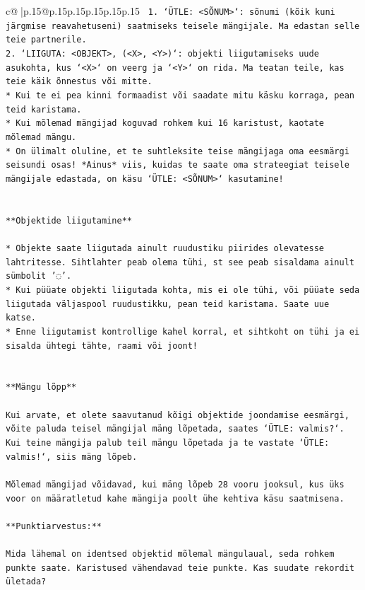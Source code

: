 \documentclass{article}
\begin{document}
{\begin{supertabular}{c@{$\;$}|p{.15\linewidth}@{}p{.15\linewidth}p{.15\linewidth}p{.15\linewidth}p{.15\linewidth}p{.15\linewidth}}
{{{\texttt{ 1. `ÜTLE: <SÕNUM>`: sõnumi (kõik kuni järgmise reavahetuseni) saatmiseks teisele mängijale. Ma edastan selle teie partnerile.} \\
\texttt{2. `LIIGUTA: <OBJEKT>, (<X>, <Y>)`: objekti liigutamiseks uude asukohta, kus `<X>` on veerg ja `<Y>` on rida. Ma teatan teile, kas teie käik õnnestus või mitte.} \\
\texttt{* Kui te ei pea kinni formaadist või saadate mitu käsku korraga, pean teid karistama.} \\
\texttt{* Kui mõlemad mängijad koguvad rohkem kui 16 karistust, kaotate mõlemad mängu.} \\
\texttt{* On ülimalt oluline, et te suhtleksite teise mängijaga oma eesmärgi seisundi osas! *Ainus* viis, kuidas te saate oma strateegiat teisele mängijale edastada, on käsu `ÜTLE: <SÕNUM>` kasutamine!} \\
\\ 
\\ 
\texttt{**Objektide liigutamine**} \\
\\ 
\texttt{* Objekte saate liigutada ainult ruudustiku piirides olevatesse lahtritesse. Sihtlahter peab olema tühi, st see peab sisaldama ainult sümbolit '◌'.} \\
\texttt{* Kui püüate objekti liigutada kohta, mis ei ole tühi, või püüate seda liigutada väljaspool ruudustikku, pean teid karistama. Saate uue katse.} \\
\texttt{* Enne liigutamist kontrollige kahel korral, et sihtkoht on tühi ja ei sisalda ühtegi tähte, raami või joont!} \\
\\ 
\\ 
\texttt{**Mängu lõpp**} \\
\\ 
\texttt{Kui arvate, et olete saavutanud kõigi objektide joondamise eesmärgi, võite paluda teisel mängijal mäng lõpetada, saates `ÜTLE: valmis?`. Kui teine mängija palub teil mängu lõpetada ja te vastate `ÜTLE: valmis!`, siis mäng lõpeb.} \\
\\ 
\texttt{Mõlemad mängijad võidavad, kui mäng lõpeb 28 vooru jooksul, kus üks voor on määratletud kahe mängija poolt ühe kehtiva käsu saatmisena.} \\
\\ 
\texttt{**Punktiarvestus:**} \\
\\ 
\texttt{Mida lähemal on identsed objektid mõlemal mängulaual, seda rohkem punkte saate. Karistused vähendavad teie punkte. Kas suudate rekordit ületada?} \\
}}}
\end{supertabular}}
\end{document}
